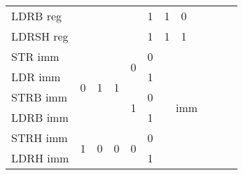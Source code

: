 \documentclass[a4paper,10pt]{report}
\begin{document}
\begin{table}[htb]
{\begin{tabular}{l|cccc|c|cc|cl|c|c|}
		\cline{1-1}\cline{6-8}
		LDRB reg  &                    &                    &                                         &                       & \multicolumn{1}{c}{1} & 1                  & 0                  &                                         &                   &                      &                       \\ 
		\cline{1-1}\cline{6-8}
		LDRSH reg &                    &                    &                                         &                       & \multicolumn{1}{c}{1} & 1                  & 1                  &                                         &                   &                      &                       \\ 
		\cline{1-10}
		STR imm   & \multirow{4}{*}{0} & \multirow{4}{*}{1} & \multicolumn{1}{c|}{\multirow{4}{*}{1}} & \multirow{2}{*}{0}    & 0                     & \multicolumn{4}{c|}{\multirow{6}{*}{imm}}                                                             &                      &                       \\ 
		\cline{1-1}\cline{6-6}
		LDR imm   &                    &                    & \multicolumn{1}{c|}{}                   &                       & 1                     & \multicolumn{4}{c|}{}                                                                                 &                      &                       \\ 
		\cline{1-1}\cline{5-6}
		STRB imm  &                    &                    & \multicolumn{1}{c|}{}                   & \multirow{2}{*}{1}    & 0                     & \multicolumn{4}{c|}{}                                                                                 &                      &                       \\ 
		\cline{1-1}\cline{6-6}
		LDRB imm  &                    &                    & \multicolumn{1}{c|}{}                   &                       & 1                     & \multicolumn{4}{c|}{}                                                                                 &                      &                       \\ 
		\cline{1-6}
		STRH imm  & \multirow{2}{*}{1} & \multirow{2}{*}{0} & \multirow{2}{*}{0}                      & \multirow{2}{*}{0}    & 0                     & \multicolumn{4}{c|}{}                                                                                 &                      &                       \\ 
		\cline{1-1}\cline{6-6}
		LDRH imm  &                    &                    &                                         &                       & 1                     & \multicolumn{4}{c|}{}                                                                                 &                      &                       \\ 

\end{tabular}}
\end{table}
\end{document}

